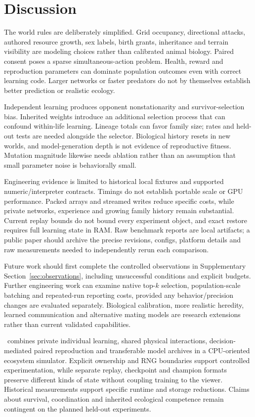 \section*{Discussion}\label{sec:limitations}
The world rules are deliberately simplified. Grid occupancy, directional
attacks, authored resource growth, sex labels, birth grants, inheritance and
terrain visibility are modeling choices rather than calibrated animal biology.
Paired consent poses a sparse simultaneous-action problem. Health, reward and
reproduction parameters can dominate population outcomes even with correct
learning code. Larger networks or faster predators do not by themselves
establish better prediction or realistic ecology.

Independent learning produces opponent nonstationarity and survivor-selection
bias. Inherited weights introduce an additional selection process that can
confound within-life learning. Lineage totals can favor family size; rates and
held-out tests are needed alongside the selector. Biological history resets in
new worlds, and model-generation depth is not evidence of reproductive fitness.
Mutation magnitude likewise needs ablation rather than an assumption that
small parameter noise is behaviorally small.

Engineering evidence is limited to historical local fixtures and supported
numeric/interpreter contracts. Timings do not establish portable scale or GPU
performance. Packed arrays and streamed writes reduce specific costs, while
private networks, experience and growing family history remain substantial.
Current replay bounds do not bound every experiment object, and exact restore
requires full learning state in RAM. Raw benchmark reports are local artifacts;
a public paper should archive the precise revisions, configs, platform details
and raw measurements needed to independently rerun each comparison.

Future work should first complete the controlled observations in
Supplementary Section~\ref{sec:observations}, including unsuccessful conditions and explicit
budgets. Further engineering work can examine native top-$k$ selection,
population-scale batching and repeated-run reporting costs, provided any
behavior/precision changes are evaluated separately. Biological calibration,
more realistic heredity, learned communication and alternative mating models
are research extensions rather than current validated capabilities.

\framework\ combines private individual learning, shared physical interactions,
decision-mediated paired reproduction and transferable model archives in a
CPU-oriented ecosystem simulator. Explicit ownership and RNG boundaries support
controlled experimentation, while separate replay, checkpoint and champion
formats preserve different kinds of state without coupling training to the
viewer. Historical measurements support specific runtime and storage reductions.
Claims about survival, coordination and inherited ecological competence remain
contingent on the planned held-out experiments.

